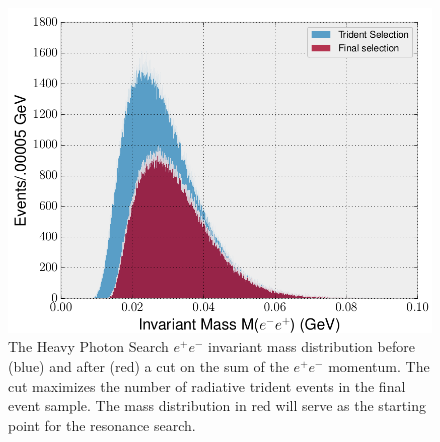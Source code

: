 \begin{figure}[t]
    \centering
    \includegraphics[width=1.0\textwidth]{images/20160504_invariant_mass_selection.png}
    \caption{The Heavy Photon Search $e^+e^-$ invariant mass distribution before (blue) 
             and after (red) a cut on the sum of the $e^+e^-$ momentum.  The cut 
             maximizes the number of radiative trident events in the final event sample.
             The mass distribution in red 
             will serve as the starting point for the resonance search.}
    \label{fig:mass_selection}
\end{figure}

